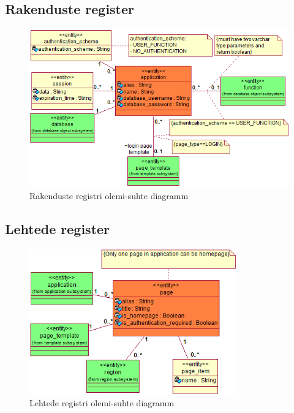\documentclass[a4paper,12pt]{article} %
\begin{document}
\subsection*{Rakenduste register}
\begin{figure}[H]
\centering
\includegraphics[width=\textwidth]{./diagrams/applications-er-diagram.png}
\caption{Rakenduste registri olemi-suhte diagramm}
\label{fig_rakenduste_registri_olemi_suhte_diagramm}
\end{figure}

\subsection*{Lehtede register}
\begin{figure}[H]
\centering
\includegraphics[width=0.8\textwidth]{./diagrams/page-er-diagram.png}
\caption{Lehtede registri olemi-suhte diagramm}
\label{fig_lehtede_registri_olemi_suhte_diagramm}
\end{figure}
\end{document}
